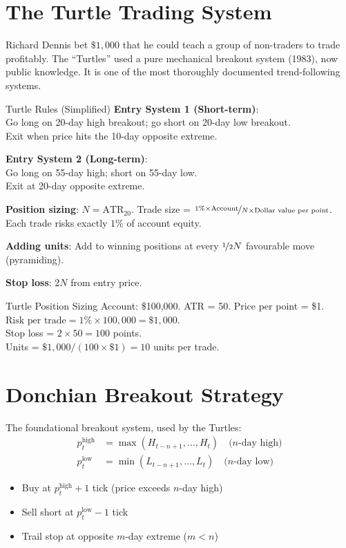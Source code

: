 \documentclass[12pt,a4paper,openany]{report}
\theoremstyle{definition}
\begin{document}
\section{The Turtle Trading System}

Richard Dennis bet $\$1{,}000$ that he could teach a group of non-traders to trade profitably. The ``Turtles'' used a pure mechanical breakout system (1983), now public knowledge. It is one of the most thoroughly documented trend-following systems.

\begin{keyconceptbox}{Turtle Rules (Simplified)}
\textbf{Entry System 1 (Short-term)}: \\
Go long on 20-day high breakout; go short on 20-day low breakout. \\
Exit when price hits the 10-day opposite extreme.

\textbf{Entry System 2 (Long-term)}: \\
Go long on 55-day high; short on 55-day low. \\
Exit at 20-day opposite extreme.

\textbf{Position sizing}: $N = \text{ATR}_{20}$. Trade size = $\nicefrac{1\%\times\text{Account}}{N\times\text{Dollar value per point}}$.\\
Each trade risks exactly $1\%$ of account equity.

\textbf{Adding units}: Add to winning positions at every $\nicefrac{1}{2}N$ favourable move (pyramiding).

\textbf{Stop loss}: $2N$ from entry price.
\end{keyconceptbox}

\begin{examplebox}{Turtle Position Sizing}
Account: \$100,000. ATR = 50. Price per point = \$1. \\
$\text{Risk per trade} = 1\% \times 100{,}000 = \$1{,}000$. \\
Stop loss = $2 \times 50 = 100$ points. \\
Units = $\$1{,}000 / (100 \times \$1) = 10$ units per trade.
\end{examplebox}

\section{Donchian Breakout Strategy}

The foundational breakout system, used by the Turtles:
\begin{align}
  p^{\text{high}}_t &= \max(H_{t-n+1}, \ldots, H_t) \quad \text{($n$-day high)} \\
  p^{\text{low}}_t &= \min(L_{t-n+1}, \ldots, L_t) \quad \text{($n$-day low)}
\end{align}
\begin{itemize}
  \item Buy at $p^{\text{high}}_t + 1$ tick (price exceeds $n$-day high)
  \item Sell short at $p^{\text{low}}_t - 1$ tick
  \item Trail stop at opposite $m$-day extreme ($m < n$)
\end{itemize}
\end{document}
